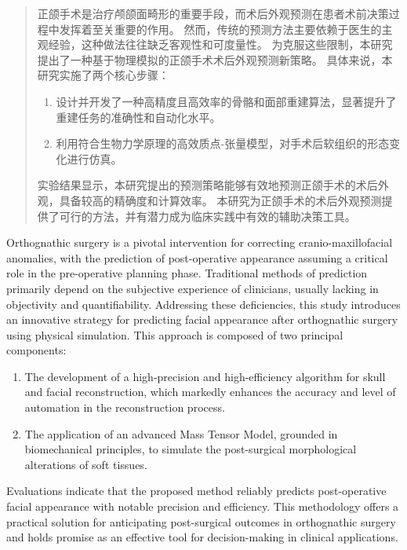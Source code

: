 

\begin{abstract}
  正颌手术是治疗颅颌面畸形的重要手段，而术后外观预测在患者术前决策过程中发挥着至关重要的作用。
  然而，传统的预测方法主要依赖于医生的主观经验，这种做法往往缺乏客观性和可度量性。
  为克服这些限制，本研究提出了一种基于物理模拟的正颌手术术后外观预测新策略。
  具体来说，本研究实施了两个核心步骤：
  \begin{enumerate}
    \item 设计并开发了一种高精度且高效率的骨骼和面部重建算法，显著提升了重建任务的准确性和自动化水平。
    \item 利用符合生物力学原理的高效质点-张量模型，对手术后软组织的形态变化进行仿真。
  \end{enumerate}
  实验结果显示，本研究提出的预测策略能够有效地预测正颌手术的术后外观，具备较高的精确度和计算效率。
  本研究为正颌手术的术后外观预测提供了可行的方法，并有潜力成为临床实践中有效的辅助决策工具。

\end{abstract}

\begin{abstract*}
  Orthognathic surgery is a pivotal intervention for correcting cranio-maxillofacial anomalies, with the prediction of post-operative appearance assuming a critical role in the pre-operative planning phase.
  Traditional methods of prediction primarily depend on the subjective experience of clinicians, usually lacking in objectivity and quantifiability.
  Addressing these deficiencies, this study introduces an innovative strategy for predicting facial appearance after orthognathic surgery using physical simulation.
  This approach is composed of two principal components:
  \begin{enumerate}
    \item The development of a high-precision and high-efficiency algorithm for skull and facial reconstruction, which markedly enhances the accuracy and level of automation in the reconstruction process.
    \item The application of an advanced Mass Tensor Model, grounded in biomechanical principles, to simulate the post-surgical morphological alterations of soft tissues.
  \end{enumerate}
  Evaluations indicate that the proposed method reliably predicts post-operative facial appearance with notable precision and efficiency.
  This methodology offers a practical solution for anticipating post-surgical outcomes in orthognathic surgery and holds promise as an effective tool for decision-making in clinical applications.

\end{abstract*}
